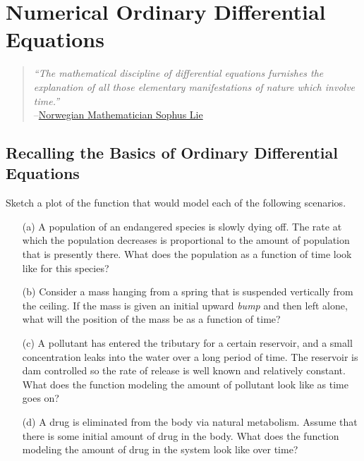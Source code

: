 \chapter{Numerical Ordinary Differential Equations}\label{ch:odes}
\begin{quote}
    {\it ``The mathematical discipline of differential equations furnishes the explanation of
    all those elementary manifestations of nature which involve time.''} \\
    --\href{https://en.wikipedia.org/wiki/Sophus_Lie#Legacy}{Norwegian
    Mathematician Sophus Lie}
\end{quote}



\section{Recalling the Basics of Ordinary Differential Equations}

\begin{problem}
    Sketch a plot of the function that would model each of the following scenarios.
    \begin{enumerate}
        \item[(a)] A population of an endangered species is slowly dying off.  The rate at
            which the population decreases is proportional to the amount of population
            that is presently there.  What does the population as a function of time look
            like for this species?
        \item[(b)] Consider a mass hanging from a spring that is suspended vertically from
            the ceiling.  If the mass is given an initial upward {\it bump} and then left
            alone, what will the position of the mass be as a function of time?
        \item[(c)] A pollutant has entered the tributary for a certain reservoir, and a
            small concentration leaks into the water over a long period of time.  The
            reservoir is dam controlled so the rate of release is well known and
            relatively constant.  What does the function modeling the amount of pollutant
            look like as time goes on?
        \item[(d)] A drug is eliminated from the body via natural metabolism.  Assume that
            there is some initial amount of drug in the body.  What does the function
            modeling the amount of drug in the system look like over time? 
    \end{enumerate}
\end{problem}

